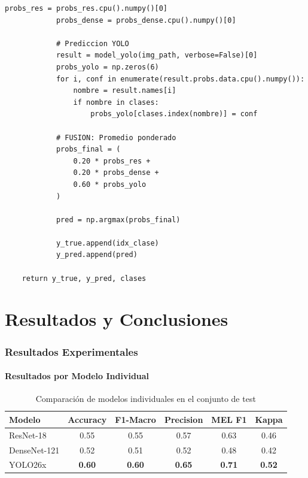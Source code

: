 \documentclass[12pt,a4paper]{article}
\begin{document}
\begin{lstlisting}[caption={Implementación completa del ensemble}]
            probs_res = probs_res.cpu().numpy()[0]
            probs_dense = probs_dense.cpu().numpy()[0]

            # Prediccion YOLO
            result = model_yolo(img_path, verbose=False)[0]
            probs_yolo = np.zeros(6)
            for i, conf in enumerate(result.probs.data.cpu().numpy()):
                nombre = result.names[i]
                if nombre in clases:
                    probs_yolo[clases.index(nombre)] = conf

            # FUSION: Promedio ponderado
            probs_final = (
                0.20 * probs_res +
                0.20 * probs_dense +
                0.60 * probs_yolo
            )

            pred = np.argmax(probs_final)

            y_true.append(idx_clase)
            y_pred.append(pred)

    return y_true, y_pred, clases
\end{lstlisting}

\newpage
\part{Resultados y Conclusiones}

\section{Resultados Experimentales}

\subsection{Resultados por Modelo Individual}

\begin{table}[H]
\centering
\caption{Comparación de modelos individuales en el conjunto de test}
\begin{tabular}{@{}lccccc@{}}
\toprule
\textbf{Modelo} & \textbf{Accuracy} & \textbf{F1-Macro} & \textbf{Precision} & \textbf{MEL F1} & \textbf{Kappa} \\
\midrule
ResNet-18 & 0.55 & 0.55 & 0.57 & 0.63 & 0.46 \\
DenseNet-121 & 0.52 & 0.51 & 0.52 & 0.48 & 0.42 \\
\rowcolor{green!20} YOLO26x & \textbf{0.60} & \textbf{0.60} & \textbf{0.65} & \textbf{0.71} & \textbf{0.52} \\
\bottomrule
\end{tabular}
\end{table}
\end{document}
